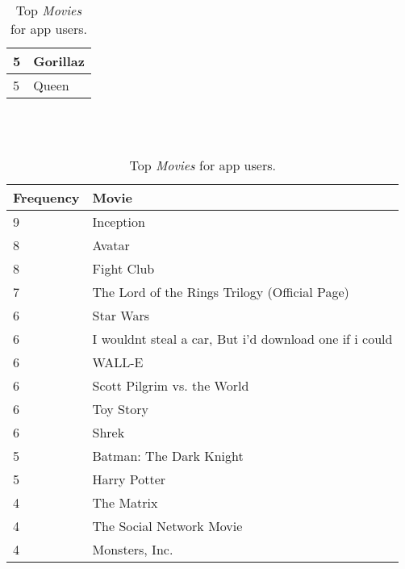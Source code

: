 \begin{table}[h]
\begin{minipage}[b]{.50\textwidth}
\begin{tabular}{|l|l|}
		5 & Gorillaz \\ \hline
		5 & Queen \\ \hline
  \end{tabular}
  \caption{Top \emph{Music} for app users.}
\end{minipage}
\\
\\
\begin{minipage}[b]{1.0\textwidth}
\centering
  \begin{tabular}{|l|l|} %
  \hline
  		\textbf{Frequency} & \textbf{Movie} \\ \hline
  		9 & Inception \\ \hline
		8 & Avatar \\ \hline
		8 & Fight Club \\ \hline
		7 & The Lord of the Rings Trilogy (Official Page) \\ \hline
		6 & Star Wars \\ \hline
		6 & I wouldnt steal a car, But i'd download one if i could \\ \hline
		6 & WALL-E \\ \hline
		6 & Scott Pilgrim vs. the World \\ \hline
		6 & Toy Story \\ \hline
		6 & Shrek \\ \hline
		5 & Batman: The Dark Knight \\ \hline
		5 & Harry Potter \\ \hline
		4 & The Matrix \\ \hline
		4 & The Social Network Movie \\ \hline
		4 & Monsters, Inc. \\ \hline
  \end{tabular}
  \caption{Top \emph{Movies} for app users.}
\end{minipage}
\end{table}

